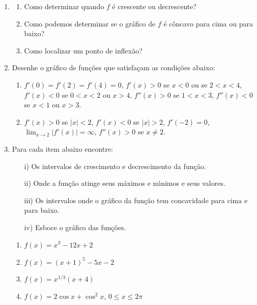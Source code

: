 \documentclass[a4paper,5pt]{amsbook}
\newcommand{\ds}{\displaystyle}
\newcommand{\ra}{\rightarrow}
\begin{document}
\begin{enumerate}
    \vspace{0.5cm}
    \item
        \begin{enumerate}
            \item Como determinar quando $f$ \'e crescente ou decrescente?
            \item Como podemos determinar se o gr\'afico de $f$ \'e c\^oncavo para
                cima ou para baixo?
            \item Como localizar um ponto de inflex\~ao?
        \end{enumerate}

    \vspace{0.5cm}
    \item Desenhe o gr\'afico de fun\c{c}\~oes que satisfa\c{c}am as condi\c{c}\~oes abaixo:
        \begin{enumerate}
            \item $f'(0)=f'(2)=f'(4)=0$, $f'(x)>0$ se $x<0$ ou se $2<x<4$,
                $f'(x)<0$ se $0<x<2$ ou $x>4$, $f''(x)>0$ se $1<x<3$,
                $f''(x)<0$ se $x<1$ ou $x>3$.
            \item $f'(x)>0$ se $|x|<2$, $f'(x)<0$ se $|x|>2$, $f'(-2)=0$,
                $\ds\lim_{x\ra2}|f'(x)|=\infty$, $f''(x)>0$ se $x\neq2$.
        \end{enumerate}

    \vspace{0.5cm}
    \item Para cada item abaixo encontre:
        \begin{enumerate}
            \item[i)] Os intervalos de crescimento e decrescimento da fun\c{c}\~ao.
            \item[ii)] Onde a fun\c{c}\~ao atinge seus m\'aximos e m\'{\i}nimos e seus valores.
            \item[iii)] Os intervalos onde o gr\'afico da fun\c{c}\~ao tem concavidade para cima e para baixo.
            \item[iv)] Esboce o gr\'afico das fun\c{c}\~oes.
        \end{enumerate}
        \vspace{0.3cm}
        \begin{enumerate}
            \item $f(x)=x^3-12x+2$
            \item $f(x)={(x+1)}^5-5x-2$
            \item $f(x)=x^{1/3}(x+4)$
            \item $f(x)=2\cos{x}+\cos^2{x}$, $0\le x \le 2\pi$
        \end{enumerate}
\end{enumerate}
\end{document}

